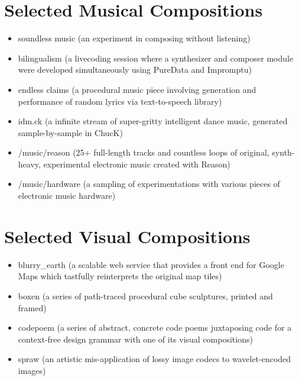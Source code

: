 \documentclass[12pt]{article}
\begin{document}
\section*{Selected Musical Compositions}
\begin{itemize}
  \item soundless music (an experiment in composing without listening)
  \item bilingualism (a livecoding session where a synthesizer and
composer module were developed simultaneously using PureData and Impromptu)
  \item endless claims (a procedural music piece involving generation and
performance of random lyrics via text-to-speech library)
  \item idm.ck (a infinite stream of super-gritty intelligent dance music,
generated sample-by-sample in ChucK) 
  \item /music/reason (25+ full-length tracks and countless loops of
original, synth-heavy, experimental electronic music created with Reason) 
  \item /music/hardware (a sampling of experimentations with various pieces of
electronic music hardware)
\end{itemize}

\section*{Selected Visual Compositions}
\begin{itemize}
  \item blurry\_earth (a scalable web service that provides a front end for Google Maps which tastfully reinterprets
the original map tiles)
  \item boxen (a series of path-traced procedural cube sculptures, printed and
framed)
  \item codepoem (a series of abstract, concrete code poems juxtaposing code for a context-free design grammar with one of its visual compositions)
  \item spraw (an artistic mis-application of lossy image codecs to
wavelet-encoded images)
\end{itemize}
\end{document}
